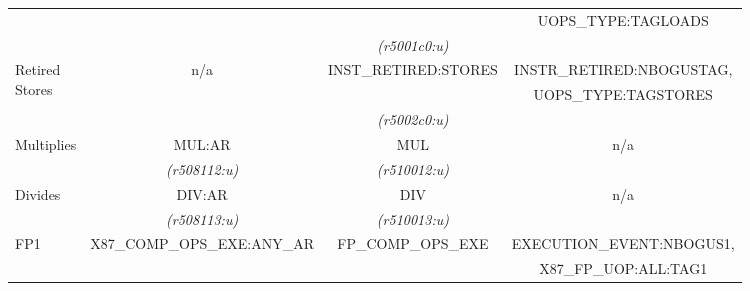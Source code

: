 \begin{tabular}{|l||c|c|c|}
                         &
                         & %
                         & %
UOPS\_TYPE:TAGLOADS      \\ %



                         &
                         & %
{\em (r5001c0:u)}        & %
			\\ %

\hline
\multirow{3}{*}{\parbox{0.5in}{Retired \\Stores}}              &  
\multirow{3}{*}{n/a}  & %
\multirow{2}{*}{INST\_RETIRED:STORES}                           & %
INSTR\_RETIRED:NBOGUSTAG, \\ %

                          &   
                          & %
                          & %
UOPS\_TYPE:TAGSTORES      \\ %

                          &
                          & %
{\em (r5002c0:u)}         & %
			\\ %

\hline
\multirow{2}{*}{\parbox{0.5in}{Multiplies}}                 &  
MUL:AR                & %
MUL                   & %
\multirow{2}{*}{n/a}  \\ %


                      &
{\em (r508112:u)}     & %
{\em (r510012:u)}     & %
			\\ %

\hline
\multirow{2}{*}{\parbox{0.5in}{Divides}}                 &  
DIV:AR                & %
DIV                   & %
\multirow{2}{*}{n/a}    \\ %

                      &
{\em (r508113:u)}     & %
{\em (r510013:u)}     & %
			\\ %

\hline
\multirow{3}{*}{\parbox{0.5in}{FP1}}                 &  
X87\_COMP\_OPS\_EXE:ANY\_AR             & %
FP\_COMP\_OPS\_EXE     & %
EXECUTION\_EVENT:NBOGUS1, \\ %

                      &
			& %
			& %
X87\_FP\_UOP:ALL:TAG1   \\ %


\end{tabular}
